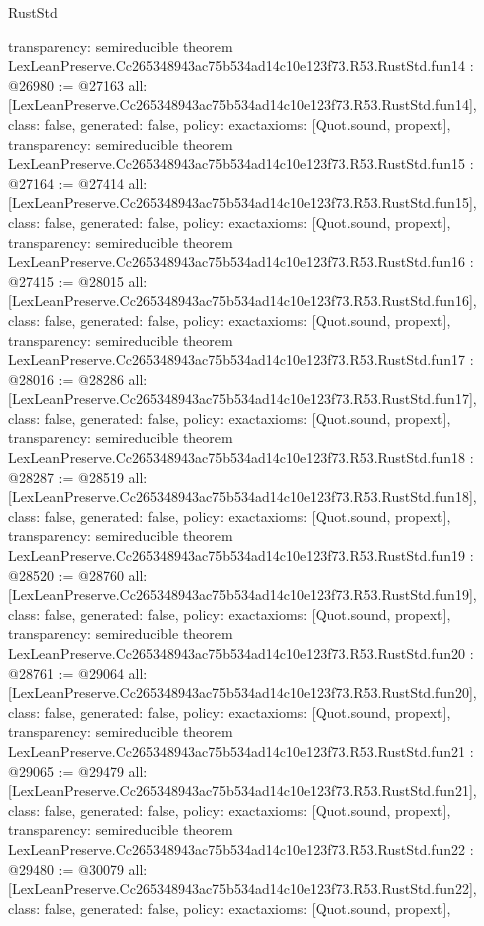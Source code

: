 \begin{lexlean}{RustStd}
\begin{coremodule}
{  transparency: semireducible
}
theorem LexLeanPreserve.Cc265348943ac75b534ad14c10e123f73.R53.RustStd.fun14 : @26980 := @27163 {
  all: [LexLeanPreserve.Cc265348943ac75b534ad14c10e123f73.R53.RustStd.fun14],
  class: false,
  generated: false,
  policy: exact{axioms: [Quot.sound, propext]},
  transparency: semireducible
}
theorem LexLeanPreserve.Cc265348943ac75b534ad14c10e123f73.R53.RustStd.fun15 : @27164 := @27414 {
  all: [LexLeanPreserve.Cc265348943ac75b534ad14c10e123f73.R53.RustStd.fun15],
  class: false,
  generated: false,
  policy: exact{axioms: [Quot.sound, propext]},
  transparency: semireducible
}
theorem LexLeanPreserve.Cc265348943ac75b534ad14c10e123f73.R53.RustStd.fun16 : @27415 := @28015 {
  all: [LexLeanPreserve.Cc265348943ac75b534ad14c10e123f73.R53.RustStd.fun16],
  class: false,
  generated: false,
  policy: exact{axioms: [Quot.sound, propext]},
  transparency: semireducible
}
theorem LexLeanPreserve.Cc265348943ac75b534ad14c10e123f73.R53.RustStd.fun17 : @28016 := @28286 {
  all: [LexLeanPreserve.Cc265348943ac75b534ad14c10e123f73.R53.RustStd.fun17],
  class: false,
  generated: false,
  policy: exact{axioms: [Quot.sound, propext]},
  transparency: semireducible
}
theorem LexLeanPreserve.Cc265348943ac75b534ad14c10e123f73.R53.RustStd.fun18 : @28287 := @28519 {
  all: [LexLeanPreserve.Cc265348943ac75b534ad14c10e123f73.R53.RustStd.fun18],
  class: false,
  generated: false,
  policy: exact{axioms: [Quot.sound, propext]},
  transparency: semireducible
}
theorem LexLeanPreserve.Cc265348943ac75b534ad14c10e123f73.R53.RustStd.fun19 : @28520 := @28760 {
  all: [LexLeanPreserve.Cc265348943ac75b534ad14c10e123f73.R53.RustStd.fun19],
  class: false,
  generated: false,
  policy: exact{axioms: [Quot.sound, propext]},
  transparency: semireducible
}
theorem LexLeanPreserve.Cc265348943ac75b534ad14c10e123f73.R53.RustStd.fun20 : @28761 := @29064 {
  all: [LexLeanPreserve.Cc265348943ac75b534ad14c10e123f73.R53.RustStd.fun20],
  class: false,
  generated: false,
  policy: exact{axioms: [Quot.sound, propext]},
  transparency: semireducible
}
theorem LexLeanPreserve.Cc265348943ac75b534ad14c10e123f73.R53.RustStd.fun21 : @29065 := @29479 {
  all: [LexLeanPreserve.Cc265348943ac75b534ad14c10e123f73.R53.RustStd.fun21],
  class: false,
  generated: false,
  policy: exact{axioms: [Quot.sound, propext]},
  transparency: semireducible
}
theorem LexLeanPreserve.Cc265348943ac75b534ad14c10e123f73.R53.RustStd.fun22 : @29480 := @30079 {
  all: [LexLeanPreserve.Cc265348943ac75b534ad14c10e123f73.R53.RustStd.fun22],
  class: false,
  generated: false,
  policy: exact{axioms: [Quot.sound, propext]},
}
\end{coremodule}
\end{lexlean}
